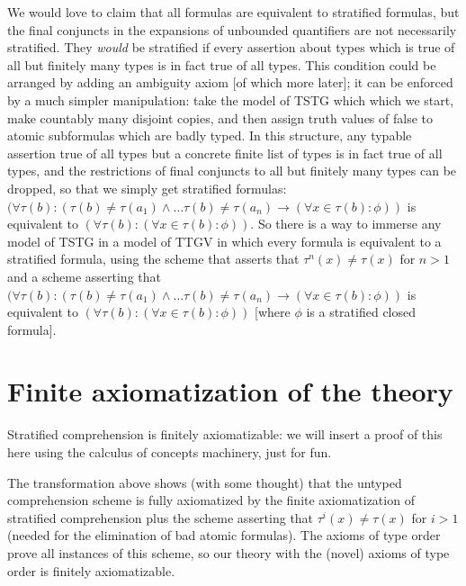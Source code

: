\documentclass[12pt]{article}
\begin{document}
We would love to claim that all formulas are equivalent to stratified formulas, but the final conjuncts in the expansions of unbounded quantifiers are not necessarily stratified.   They {\em would\/} be stratified if every assertion about types which is true of all but finitely many types is in fact true of all types.  This condition could be arranged by
adding an ambiguity axiom [of which more later];  it can be enforced by a much simpler manipulation:  take the model of TSTG which which we start, make countably many disjoint copies, and then assign truth values of false to atomic subformulas which are badly typed.  In this structure, any typable assertion true of all types but a concrete finite list of types is in fact true of all types,
and the restrictions of final conjuncts to all but finitely many types can be dropped, so that we simply get stratified formulas:  $(\forall \tau(b):(\tau(b) \neq \tau(a_1) \wedge \ldots \tau(b) \neq \tau(a_n) \rightarrow (\forall x \in \tau(b):\phi))$ is equivalent to $(\forall \tau(b):(\forall x \in \tau(b):\phi))$.  So there is a way to immerse any model of TSTG in a model of TTGV in which every formula is equivalent to a stratified formula, using the scheme that asserts that $\tau^n(x) \neq \tau(x)$ for $n>1$ and a scheme asserting that $(\forall \tau(b):(\tau(b) \neq \tau(a_1) \wedge \ldots \tau(b) \neq \tau(a_n) \rightarrow (\forall x \in \tau(b):\phi))$ is equivalent to $(\forall \tau(b):(\forall x \in \tau(b):\phi))$ [where $\phi$ is a stratified closed formula]. 


\section{Finite axiomatization of the theory}

Stratified comprehension is finitely axiomatizable:  we will insert a proof of this here using the calculus of concepts machinery, just for fun.

The transformation above shows (with some thought) that the untyped comprehension scheme is fully axiomatized by the finite axiomatization of stratified comprehension plus the scheme asserting that $\tau^i(x) \neq \tau(x)$ for $i>1$ (needed for the elimination of bad atomic formulas).  The axioms of type order prove all instances of this scheme,
so our theory with the (novel) axioms of type order is finitely axiomatizable.
\end{document}
